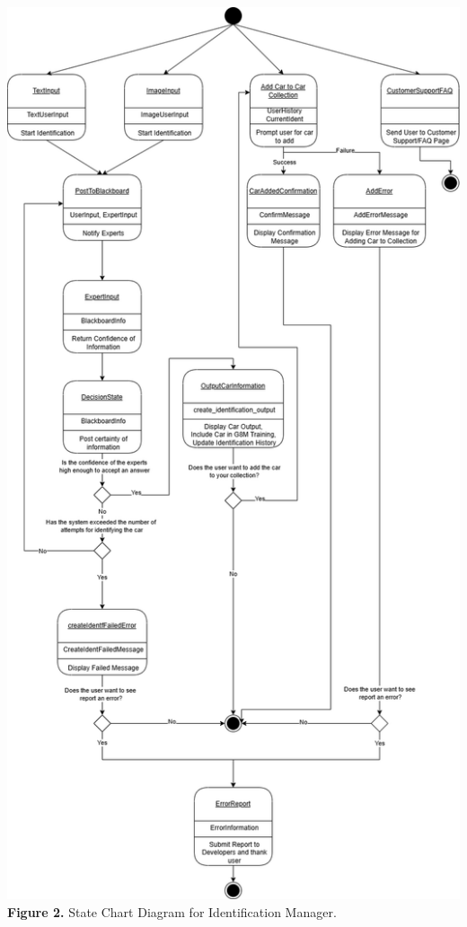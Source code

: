 \documentclass[]{article}
\begin{document}
\begin{center}
	\includegraphics[scale=0.38]{State Diagrams/IdentificationManagerStateDiagram.drawio.png}\\
	\textbf{Figure 2.} State Chart Diagram for Identification Manager.\\
\end{center}
\end{document}
